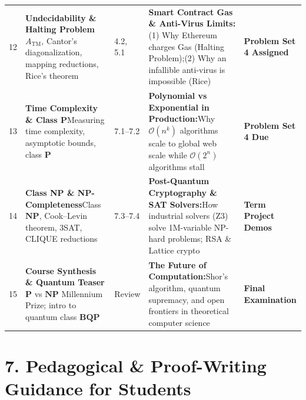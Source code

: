 \documentclass[11pt,a4paper]{article}
\begin{document}
{\begin{longtable}{@{} C{0.6cm} L{3.5cm} C{1.3cm} L{5.2cm} L{3.6cm} @{}}
    12 & \textbf{Undecidability \& Halting Problem}\newline $A_{\text{TM}}$, Cantor's diagonalization, mapping reductions, Rice's theorem & 4.2, 5.1 & \textbf{Smart Contract Gas \& Anti-Virus Limits:}\newline (1) Why Ethereum charges Gas (Halting Problem);\newline (2) Why an infallible anti-virus is impossible (Rice) & \textbf{Problem Set 4 Assigned} \\

    13 & \textbf{Time Complexity \& Class P}\newline Measuring time complexity, asymptotic bounds, class $\mathbf{P}$ & 7.1--7.2 & \textbf{Polynomial vs Exponential in Production:}\newline Why $\mathcal{O}(n^k)$ algorithms scale to global web scale while $\mathcal{O}(2^n)$ algorithms stall & \textbf{Problem Set 4 Due} \\

    14 & \textbf{Class NP \& NP-Completeness}\newline Class $\mathbf{NP}$, Cook--Levin theorem, 3SAT, CLIQUE reductions & 7.3--7.4 & \textbf{Post-Quantum Cryptography \& SAT Solvers:}\newline How industrial solvers (Z3) solve 1M-variable NP-hard problems; RSA \& Lattice crypto & \textbf{Term Project Demos} \\

    15 & \textbf{Course Synthesis \& Quantum Teaser}\newline $\mathbf{P}$ vs $\mathbf{NP}$ Millennium Prize; intro to quantum class $\mathbf{BQP}$ & Review & \textbf{The Future of Computation:}\newline Shor's algorithm, quantum supremacy, and open frontiers in theoretical computer science & \textbf{Final Examination} \\
    \hline
\end{longtable}
}

\section*{7. Pedagogical \& Proof-Writing Guidance for Students}
\end{document}
